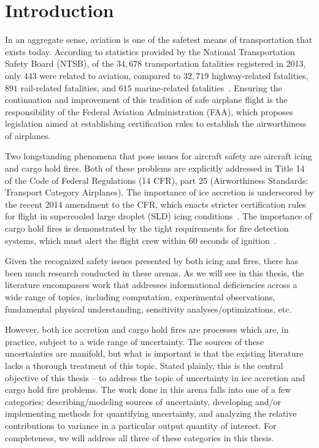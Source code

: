 
\chapter{Introduction\label{ch:intro}}

In an aggregate sense, aviation is one of the safetest means of
transportation that exists today. According to statistics provided by
the National Transportation Safety Board (NTSB), of the $34,678$
transportation fatalities registered in 2013, only $443$ were related
to aviation, compared to $32,719$ highway-related fatalities, $891$
rail-related fatalities, and $615$ marine-related
fatalities~\cite{ntsbStats}. Ensuring the continuation and improvement
of this tradition of safe airplane flight is the responsibility of the
Federal Aviation Administration (FAA), which proposes legislation
aimed at establishing certification rules to establish the
airworthiness of airplanes.

Two longstanding phenomena that pose issues for aircraft safety are
aircraft icing and cargo hold fires. Both of these problems are
explicitly addressed in Title 14 of the Code of Federal Regulations
(14 CFR), part 25 (Airworthiness Standards: Transport Category
Airplanes). The importance of ice accretion is underscored by the
recent 2014 amendment to the CFR, which enacts stricter certification
rules for flight in supercooled large droplet (SLD) icing
conditions~\cite{fedregisterSLD}. The importance of cargo hold fires
is demonstrated by the tight requirements for fire detection systems,
which must alert the flight crew within 60 seconds of
ignition~\cite{CFR}.

Given the recognized safety issues presented by both icing and fires,
there has been much research conducted in these arenas. As we will see
in this thesis, the literature encompasses work that addresses informational
deficiencies across a wide range of topics, including computation,
experimental observations, fundamental physical understanding,
sensitivity analyses/optimizations, etc.

However, both ice accretion and cargo hold fires are processes which
are, in practice, subject to a wide range of uncertainty. The sources
of these uncertainties are manifold, but what is important is that the
existing literature lacks a thorough treatment of this
topic. Stated plainly, this is the central objective of this thesis --
to address the topic of uncertainty in ice accretion and cargo hold
fire problems. The work done in this arena falls into one of a few
categories: describing/modeling sources of uncertainty, developing
and/or implementing methods for quantifying uncertainty, and analyzing
the relative contributions to variance in a particular output quantity
of interest. For completeness, we will address all three of these
categories in this thesis.




